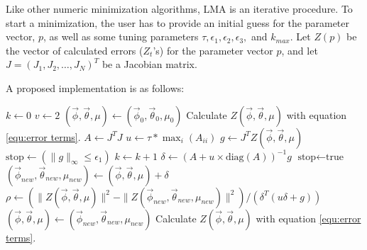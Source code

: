 Like other numeric minimization algorithms, LMA is an iterative
procedure.  To start a minimization, the user has to provide an
initial guess for the parameter vector, $p$, as well as some tuning
parameters $\tau, \epsilon_1, \epsilon_2, \epsilon_3,$ and $k_{max}$.
Let $Z(p)$ be the vector of calculated errors ($Z_t$'s) for the
parameter vector $p$, and let $J = (J_{1}, J_{2}, \dots, J_N)^T$
be a Jacobian matrix.

A proposed implementation is as follows:
\begin{algorithm}
\begin{algorithmic}[1]
	\State $k \leftarrow 0$  
	\State $v \leftarrow 2$ 
	\State $(\vec{\phi},\vec{\theta},\mu) \leftarrow (\vec{\phi}_0,\vec{\theta}_0,\mu_0)$ 
	\State Calculate $Z(\vec{\phi},\vec{\theta},\mu)$ with equation \ref{equ:error terms}.  
	\State $A \leftarrow J^T J$   
	\State $u \leftarrow \tau * \max_i(A_{ii})$ 
	\State $g \leftarrow J^T Z(\vec{\phi},\vec{\theta},\mu)$ 
	\State $ \text{stop} \leftarrow (\|g\|_{\infty} \le \epsilon_1)$ 
		\State $k \leftarrow k + 1$
		\Repeat
			\State $\delta \leftarrow (A + u \times \text{diag}(A))^{-1} g$ 
			 
				\State  $\text{stop} \leftarrow \text{true}$
			\Else
				\State $(\vec{\phi}_{new},\vec{\theta}_{new},\mu_{new}) \leftarrow (\vec{\phi},\vec{\theta},\mu) + \delta$ 
				\State $\rho \leftarrow (\| Z(\vec{\phi},\vec{\theta},\mu)\|^2 - \| Z(\vec{\phi}_{new},\vec{\theta}_{new},\mu_{new})\|^2 )/(\delta^T(u \delta + g))$ 
				 
					\State $(\vec{\phi},\vec{\theta},\mu) \leftarrow (\vec{\phi}_{new},\vec{\theta}_{new},\mu_{new})$ 
					\State Calculate $Z(\vec{\phi},\vec{\theta},\mu)$ with equation \ref{equ:error terms}.

\end{algorithmic}
\end{algorithm}
